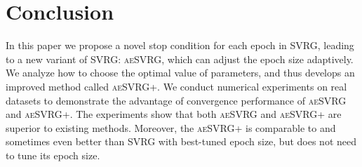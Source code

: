 \documentclass[conference]{IEEEtran}
\begin{document}
\section{Conclusion}
In this paper we propose a novel stop condition for each epoch in SVRG, leading to a new variant of SVRG: \textsc{aeSVRG}, which can adjust the epoch size adaptively. We analyze how to choose the optimal value of parameters, and thus develops an improved method called \textsc{aeSVRG+}. We conduct numerical experiments on real datasets to demonstrate the advantage of convergence performance of \textsc{aeSVRG} and \textsc{aeSVRG+}. The experiments show that both \textsc{aeSVRG} and \textsc{aeSVRG+} are superior to existing methods. Moreover, the \textsc{aeSVRG+} is comparable to and sometimes even better than SVRG with best-tuned epoch size, but does not need to tune its epoch size.
\label{conclusion}







%
%
%


\newpage




\end{document}
